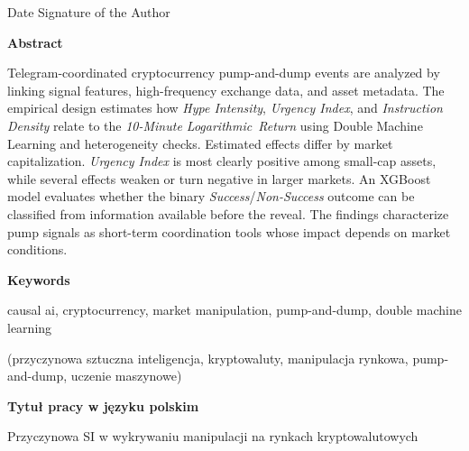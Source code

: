 \documentclass[12pt, a4paper]{report}
\begin{document}
\vspace{1.15cm}

\noindent Date \hfill Signature of the Author

\newpage

\thispagestyle{plain}

\begin{center}
  \textbf{Abstract}
\end{center}
\noindent Telegram-coordinated cryptocurrency pump-and-dump events are analyzed by linking signal features, high-frequency exchange data, and asset metadata. The empirical design estimates how \textit{Hype Intensity}, \textit{Urgency Index}, and \textit{Instruction Density} relate to the \textit{10-Minute Logarithmic~Return} using Double Machine Learning and heterogeneity checks. Estimated effects differ by market capitalization. \textit{Urgency Index} is most clearly positive among small-cap assets, while several effects weaken or turn negative in larger markets. An XGBoost model evaluates whether the binary \textit{Success}/\textit{Non-Success} outcome can be classified from information available before the reveal. The findings characterize pump signals as short-term coordination tools whose impact depends on market conditions.

\vspace{1cm}
\begin{center}
  \textbf{Keywords}
\end{center}
\begin{center}
  causal ai, cryptocurrency, market manipulation, pump-and-dump, double machine learning
\end{center}

\begin{center}
  (przyczynowa sztuczna inteligencja, kryptowaluty, manipulacja rynkowa, pump-and-dump, uczenie maszynowe)
\end{center}

\vspace{1cm}
\begin{center}
  \textbf{Tytuł pracy w języku polskim}
\end{center}
\begin{center}
  Przyczynowa SI w wykrywaniu manipulacji na rynkach kryptowalutowych
\end{center}

\newpage
\end{document}

